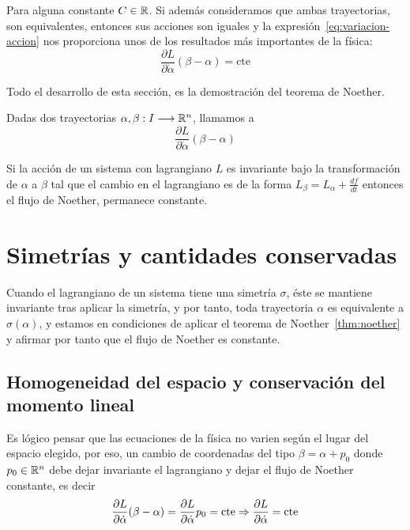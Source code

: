 Para alguna constante $C\in\mathbb{R}$.
Si además consideramos que ambas trayectorias, son equivalentes, entonces sus acciones son iguales y la expresión~\ref{eq:variacion-accion} nos proporciona unos de los resultados más importantes de la física:
\begin{equation*}
    \frac{\partial L}{\partial\dot{\alpha}}(\beta-\alpha) = \text{cte}
\end{equation*}

Todo el desarrollo de esta sección, es la demostración del teorema de Noether.

\begin{definition}
    Dadas dos trayectorias $\alpha,\beta:I\longrightarrow \mathbb{R}^n$, llamamos  a
    \begin{equation}
        \label{eq:flujo_noether}
        \frac{\partial L}{\partial\dot{\alpha}}(\beta-\alpha)
    \end{equation}
\end{definition}

\begin{theorem}
    \label{thm:noether}
    Si la acción de un sistema con lagrangiano $L$ es invariante bajo la transformación de $\alpha$ a $\beta$ tal que el cambio en el lagrangiano es de la forma $L_\beta=L_\alpha+\frac{df}{dt}$ entonces el flujo de Noether, permanece constante.
\end{theorem}


\chapter{Simetrías y cantidades conservadas}
Cuando el lagrangiano de un sistema tiene una simetría $\sigma$, éste se mantiene invariante tras aplicar la simetría, y por tanto, toda trayectoria $\alpha$ es equivalente a $\sigma(\alpha)$, y estamos en condiciones de aplicar el teorema de Noether~\ref{thm:noether} y afirmar por tanto que el flujo de Noether es constante.


\section{Homogeneidad del espacio y conservación del momento lineal}
Es lógico pensar que las ecuaciones de la física no varien según el lugar del espacio elegido, por eso, un cambio de coordenadas del tipo $\beta=\alpha+p_0$ donde $p_0\in\mathbb{R}^n$ debe dejar invariante el lagrangiano y dejar el flujo de Noether constante, es decir
\begin{equation}
    \label{eq:conservacion_momento_lineal}
    \frac{\partial L}{\partial\dot{\alpha}}(\beta-\alpha) = \frac{\partial L}{\partial\dot{\alpha}}p_0=\text{cte}\Rightarrow\frac{\partial L}{\partial\dot{\alpha}}=\text{cte}
\end{equation}

